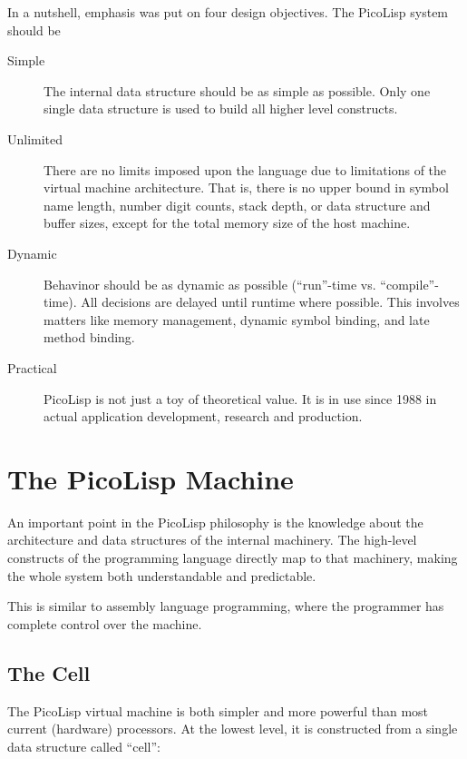 In a nutshell, emphasis was put on four design objectives. The PicoLisp
system should be

\begin{description}

\item[Simple] The internal data structure should be as simple as
  possible. Only one single data structure is used to build all higher
  level constructs.

\item[Unlimited] There are no limits imposed upon the language due to
  limitations of the virtual machine architecture. That is, there is
  no upper bound in symbol name length, number digit counts, stack
  depth, or data structure and buffer sizes, except for the total
  memory size of the host machine.

\item[Dynamic] Behavinor should be as dynamic as possible (``run''-time
  vs. ``compile''-time). All decisions are delayed until runtime where
  possible. This involves matters like memory management, dynamic
  symbol binding, and late method binding.

\item[Practical] PicoLisp is not just a toy of theoretical value. It
  is in use since 1988 in actual application development, research and
  production.

\end{description}

\section{The PicoLisp Machine}
\label{sec:refm-the-picolisp-machine}


An important point in the PicoLisp philosophy is the knowledge about the
architecture and data structures of the internal machinery. The
high-level constructs of the programming language directly map to that
machinery, making the whole system both understandable and predictable.

This is similar to assembly language programming, where the programmer
has complete control over the machine.


 
\subsection{The Cell}
\label{sec:refm-the-cell}


The PicoLisp virtual machine is both simpler and more powerful than most
current (hardware) processors. At the lowest level, it is constructed
from a single data structure called ``cell'':



